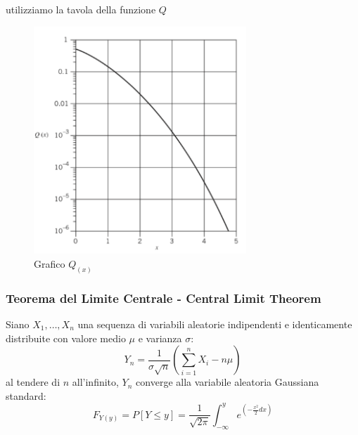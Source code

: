            utilizziamo la tavola della funzione $Q$
            \begin{figure}[H]
                \centering
                \includegraphics[width = 8cm]{media/grafo funzione q.png}
                \caption{Grafico $Q_{(x)}$}
            \end{figure}
        \subsubsection{Teorema del Limite Centrale - Central Limit Theorem}\label{Teorema del Limite Centrale - Central Limit Theorem}
            Siano $X_1,\dots,X_n$ una sequenza di variabili aleatorie indipendenti e identicamente distribuite con valore medio $\mu$ e varianza $\sigma$:
            \[
                Y_n = \frac{1}{\sigma\sqrt{n}}\left(\sum_{i=1}^{n}X_i-n\mu\right)    
            \]
            al tendere di $n$ all'infinito, $Y_n$ converge alla variabile aleatoria Gaussiana standard:
            \[
                F_{Y(y)} =P[Y\leq y] = \frac{1}{\sqrt{2\pi}} \int_{-\infty}^{y}e^{\left(-\frac{x^2}{2}dx\right)}    
            \]
